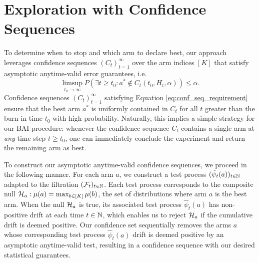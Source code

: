 \documentclass{article}
\begin{document}





\section{Exploration with Confidence Sequences}\label{sec:av_tests}


To determine when to stop and which arm to declare best, our approach leverages confidence sequences $\left(C_t\right)_{t=1}^\infty$ over the arm indices $[K]$ that satisfy asymptotic anytime-valid error guarantees, i.e.
\begin{equation}\label{eq:conf_seq_requirement}
    \limsup_{t_0 \rightarrow \infty}P\left(\exists t \geq t_0: a^* \not\in  C_t(t_0, H_t, \alpha) \right) \leq \alpha.
\end{equation}
Confidence sequences $(C_t)_{t=1}^\infty$ satisfying Equation \eqref{eq:conf_seq_requirement} ensure that the best arm $a^*$ is uniformly contained in $C_t$ for all $t$ greater than the burn-in time $t_0$ with high probability. Naturally, this implies a simple strategy for our BAI procedure: whenever the confidence sequence $C_t$ contains a single arm at \textit{any} time step $t \geq t_0$, one can immediately conclude the experiment and return the remaining arm as best. 

To construct our asymptotic anytime-valid confidence sequences, we proceed in the following manner. For each arm $a$, we construct a test process $(\hat\psi_t(a))_{t \in \mathbb{N}}$ adapted to the filtration $(\mathcal{F}_t)_{t \in \mathbb{N}}$. Each test process corresponds to the composite null $\mathcal{H}_a: \mu(a) = \max_{b \in [K]} \mu(b)$, the set of distributions where arm $a$ is the best arm. When the null $\mathcal{H}_a$ is true, its associated test process $\hat\psi_t(a)$ has non-positive drift at each time $t \in \mathbb{N}$, which enables us to reject $\mathcal{H}_a$ if the cumulative drift is deemed positive. Our confidence set sequentially removes the arms $a$ whose corresponding test process $\hat\psi_t(a)$ drift is deemed positive by an asymptotic anytime-valid test, resulting in a confidence sequence with our desired statistical guarantees. 
\end{document}
